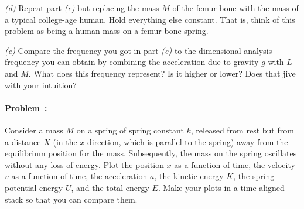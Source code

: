 \documentclass[12pt]{article}
\newcounter{problem}
\begin{document}
\textsl{(d)} Repeat part \textsl{(c)} but replacing the mass $M$ of
the femur bone with the mass of a typical college-age human.  Hold
everything else constant.  That is, think of this problem as being a
human mass on a femur-bone spring.

\textsl{(e)} Compare the frequency you got in part \textsl{(c)} to the
dimensional analysis frequency you can obtain by combining the
acceleration due to gravity $g$ with $L$ and $M$.  What does this
frequency represent?  Is it higher or lower?  Does that jive with your
intuition?

\paragraph{Problem~\theproblem:}%
Consider a mass $M$ on a spring of spring constant $k$, released from
rest but from a distance $X$ (in the $x$-direction, which is parallel
to the spring) away from the equilibrium position for the mass.
Subsequently, the mass on the spring oscillates without any loss of
energy.  Plot the position $x$ as a function of time, the velocity $v$
as a function of time, the acceleration $a$, the kinetic energy $K$,
the spring potential energy $U$, and the total energy $E$.  Make your
plots in a time-aligned stack so that you can compare them.
\end{document}

